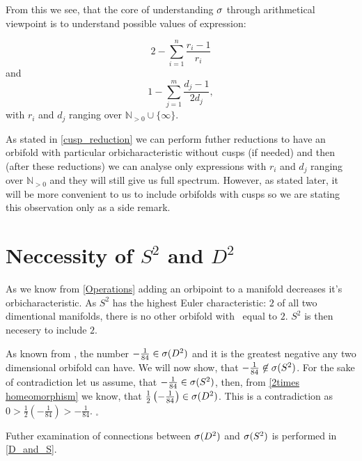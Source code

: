 From this we see, that the core of understanding ${\sigma}$ through arithmetical viewpoint 
is to understand possible values of expression:

\begin{equation}\label{S2_sum}
2 - \sum_{i=1}^n \frac{r_i-1}{r_i}
\end{equation}
and 
\begin{equation}\label{D2_sum}
1 - \sum_{j=1}^m \frac{d_j-1}{2d_j},
\end{equation}
with $r_i$ and $d_j$ ranging over $\mathbb{N}_{>0}\cup \{\infty\}$.

As stated in \ref{cusp_reduction} we can perform futher reductions to have an orbifold with 
particular orbicharacteristic without cusps (if needed) and then (after these reductions) 
we can analyse only expressions with $r_i$ and $d_j$ ranging over $\mathbb{N}_{>0}$ and 
they will still give us full spectrum. 
However, as stated later, it will be more convenient to us to include orbifolds with cusps 
so we are stating this observation only as a side remark.


\section{Neccessity of $S^2$ and $D^2$}\label{neccessity of d2 and s2}
As we know from \ref{Operations} adding an orbipoint to a manifold decreases it's 
orbicharacteristic. As $S^2$ has the highest Euler characteristic: $2$ of all 
two dimentional manifolds, there is no other orbifold with \Eoc\ equal to $2$. 
$S^2$ is then necesery to include $2$. 

As known from \cite{największy orbifold}, the number $-\frac{1}{84}\in{{\sigma}(D^2)}$ and it is 
the greatest negative 
\Eoc any two dimensional orbifold can have. We will now show, that 
$-\frac{1}{84} \not\in {{\sigma}(S^2)}$. For the sake of contradiction let us assume, that 
$-\frac{1}{84} \in {{\sigma}(S^2)}$, then, from \ref{2times homeomorphism} we know, that 
$\frac{1}{2}\left(-\frac{1}{84}\right)\in {{\sigma}(D^2)}$. This is a contradiction as 
$0 > \frac{1}{2}\left(-\frac{1}{84}\right) > -\frac{1}{84}$. $_\square$  

Futher examination of connections between ${{\sigma}(D^2)}$ and ${{\sigma}(S^2)}$ is performed in \ref{D_and_S}.






